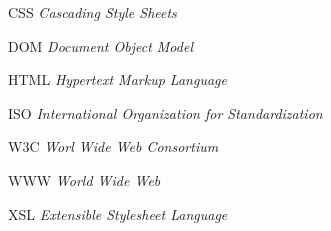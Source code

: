 %
%

\begin{siglas}
    \item[CSS] \textit{Cascading Style Sheets}
    \item[DOM] \textit{Document Object Model}    
    \item[HTML] \textit{Hypertext Markup Language}
    \item[ISO] \textit{International Organization for Standardization}
    \item[W3C] \textit{Worl Wide Web Consortium}
    \item[WWW] \textit{World Wide Web}
    \item[XSL] \textit{Extensible Stylesheet Language}
\end{siglas}
